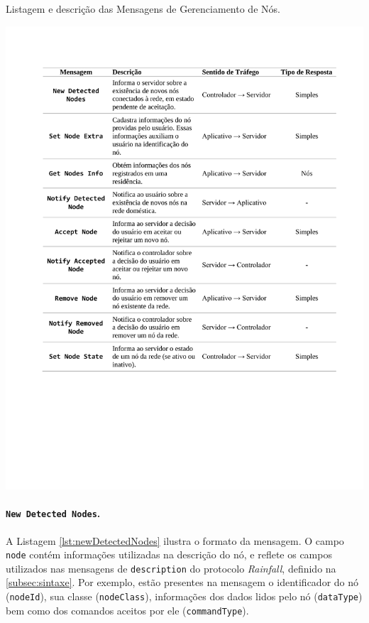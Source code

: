 \begin{table}[hp]
	\centering
	\caption{Listagem e descrição das Mensagens de Gerenciamento de Nós.}\smallskip
	\label{tab:mensagens_nos}
	\includegraphics[width=\textwidth]{tabelas/mensagens_nos.pdf}
\end{table}

\paragraph*{\texttt{New Detected Nodes}.} A Listagem \ref{lst:newDetectedNodes} ilustra o formato da mensagem. O campo \texttt{node} contém informações utilizadas na descrição do nó, e reflete os campos utilizados nas mensagens de \texttt{description} do protocolo \textit{Rainfall}, definido na \ref{subsec:sintaxe}. Por exemplo, estão presentes na mensagem o identificador do nó (\texttt{nodeId}), sua classe (\texttt{nodeClass}), informações dos dados lidos pelo nó (\texttt{dataType}) bem como dos comandos aceitos por ele (\texttt{commandType}).

